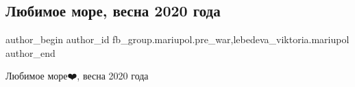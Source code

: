  
 
 
 
 

\subsection{Любимое море, весна 2020 года}
\label{sec:11_02_2023.fb.fb_group.mariupol.pre_war.10.lyubimoe_more__vesna}
 
\ifcmt
 author_begin
   author_id fb_group.mariupol.pre_war,lebedeva_viktoria.mariupol
 author_end
\fi

Любимое море❤️, весна 2020 года
